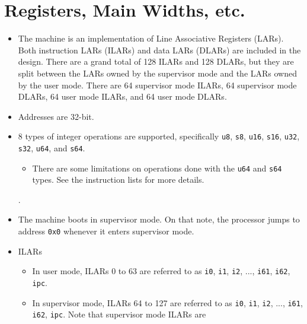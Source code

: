 \documentclass{article}
\begin{document}
\section{Registers, Main Widths, etc.}
	\begin{itemize}
	\item The machine is an implementation of Line Associative Registers
		(LARs). Both instruction LARs (ILARs) and data LARs (DLARs) are
		included in the design. There are a grand total of 128 ILARs and
		128 DLARs, but they are split between the LARs owned by the
		supervisor mode and the LARs owned by the user mode. There are 64
		supervisor mode ILARs, 64 supervisor mode DLARs, 64 user mode
		ILARs, and 64 user mode DLARs.
	\item Addresses are 32-bit.
	\item 8 types of integer operations are supported, specifically
		\texttt{u8}, \texttt{s8},
		\texttt{u16}, \texttt{s16},
		\texttt{u32}, \texttt{s32},
		\texttt{u64}, and \texttt{s64}.
		\begin{itemize}
		\item There are some limitations on operations done with the
			\texttt{u64} and \texttt{s64} types. See the instruction
			lists for more details.
		\end{itemize}.
	\item The machine boots in supervisor mode. On that note, the processor
		jumps to address \texttt{0x0} whenever it enters supervisor mode.
	\item ILARs
		\begin{itemize}
		\item In user mode, ILARs 0 to 63 are referred to as \texttt{i0},
			\texttt{i1}, \texttt{i2}, ..., \texttt{i61}, \texttt{i62},
			\texttt{ipc}.
		\item In supervisor mode, ILARs 64 to 127 are referred to as
			\texttt{i0}, \texttt{i1}, \texttt{i2}, ..., \texttt{i61},
			\texttt{i62}, \texttt{ipc}. Note that supervisor mode ILARs are

\end{itemize}
\end{itemize}
\end{document}
